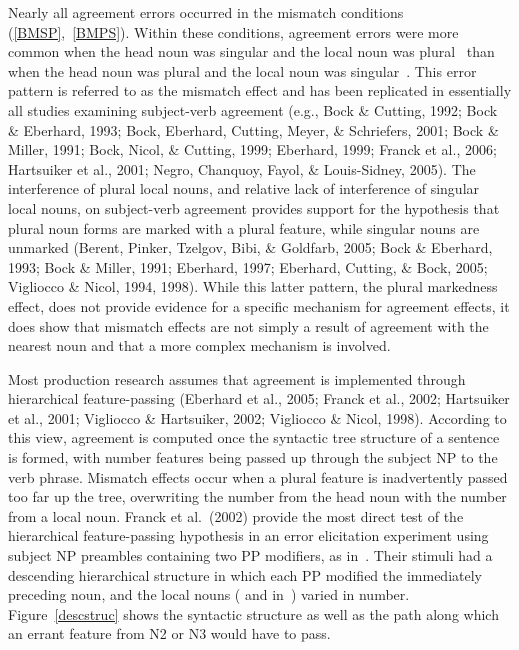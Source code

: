 \documentclass[12pt,titlepage]{article}
\newcommand{\NOTE}[1]{\textbf{*** #1 ***}}  %
\newcommand{\IGNORE}[1]{} %
\begin{document}
Nearly all agreement errors\IGNORE{ ($>90\%$)} occurred in the mismatch
conditions (\ref{BMSP},~\ref{BMPS}).  Within these conditions, agreement
errors were more common when the head noun was singular and the local noun
was plural~ than when the head noun was plural and the local
noun was singular~.  This error pattern is referred to as the
mismatch effect and has been replicated in essentially all studies
examining subject-verb agreement (e.g., Bock \& Cutting, 1992; Bock \&
Eberhard, 1993; Bock, Eberhard, Cutting, Meyer, \& Schriefers, 2001; Bock
\& Miller, 1991; Bock, Nicol, \& Cutting, 1999; Eberhard, 1999; Franck et
al., 2006; Hartsuiker et al., 2001; Negro, Chanquoy, Fayol, \&
Louis-Sidney, 2005).  The interference of plural local nouns, and relative
lack of interference of singular local nouns, on subject-verb agreement
provides support for the hypothesis that plural noun forms are marked with
a plural feature, while singular nouns are unmarked (Berent, Pinker,
Tzelgov, Bibi, \& Goldfarb, 2005; Bock \& Eberhard, 1993; Bock \& Miller,
1991; Eberhard, 1997; Eberhard, Cutting, \& Bock, 2005; Vigliocco \& Nicol,
1994, 1998).  While this latter pattern, the plural markedness effect, does
not provide evidence for a specific mechanism for agreement effects, it
does show that mismatch effects are not simply a result of agreement with
the nearest noun and that a more complex mechanism is involved.

Most production research assumes that agreement is implemented through
hierarchical feature-passing (Eberhard et al., 2005; Franck et al., 2002;
Hartsuiker et al., 2001; Vigliocco \& Hartsuiker, 2002; Vigliocco \& Nicol,
1998).  According to this view, agreement is computed once the syntactic
tree structure of a sentence is formed, with number features being passed
up through the subject NP to the verb phrase.  Mismatch effects occur when
a plural feature is inadvertently passed too far up the tree, overwriting
the number from the head noun with the number from a local noun.  Franck et
al.\ (2002) provide the most direct test of the hierarchical
feature-passing hypothesis in an error elicitation experiment using subject
NP preambles containing two PP modifiers, as
in~.\IGNORE{\footnote{We focus on singular head versions;
however, Franck et al.\ (2002) did manipulate head noun
plurality.}\NOTE{think it's OK not to point this out}} Their stimuli had a
descending hierarchical structure in which each PP modified the immediately
preceding noun, and the local nouns ( and 
in~) varied in number.  Figure~\ref{descstruc} shows the
syntactic structure as well as the path along which an errant feature from
N2 or N3 would have to pass.
\end{document}
